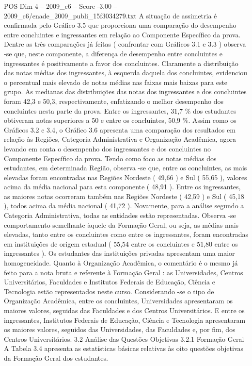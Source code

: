 \begin{textsample}{POS Dim 4 – 2009\_c6 – Score -3.00 – 2009\_c6/enade\_2009\_publi\_15f3034279.txt}
A situação de assimetria é confirmada pelo Gráfico 3.5 que proporciona uma comparação do desempenho entre concluintes e ingressantes em relação ao Componente Específico da prova.
Dentre as três comparações já feitas ( confrontar com Gráficos 3.1 e 3.3 ) observa -se que, neste componente, a diferença de desempenho entre concluintes e ingressantes é positivamente a favor dos concluintes.
Claramente a distribuição das notas médias dos ingressantes, à esquerda daquela dos concluintes, evidenciou o percentual mais elevado de notas médias nas faixas mais baixas para este grupo.
As medianas das distribuições das notas dos ingressantes e dos concluintes foram 42,3 e 50,3, respectivamente, enfatizando o melhor desempenho dos concluintes nesta parte da prova.
Entre os ingressantes, 31,7 \% dos estudantes obtiveram notas superiores a 50 e entre os concluintes, 50,9 \%.
Assim como os Gráficos 3.2 e 3.4, o Gráfico 3.6 apresenta uma comparação dos resultados em relação às Regiões, Categoria Administrativa e Organização Acadêmica, agora levando em conta o desempenho dos ingressantes e dos concluintes no Componente Específico da prova.
Tendo como foco as notas médias dos estudantes, em determinada Região, observa -se que, entre os concluintes, as mais elevadas foram encontradas nas Regiões Nordeste ( 49,66 ) e Sul ( 55,65 ), valores acima da média nacional para esta componente ( 48,91 ).
Entre os ingressantes, as maiores notas ocorreram também nas Regiões Nordeste ( 42,59 ) e Sul ( 45,18 ), todos acima da média nacional ( 41,72 ).
Novamente, para a análise segundo a Categoria Administrativa, todas as entidades estão representadas.
Observa -se comportamento semelhante àquele da Formação Geral, ou seja, as médias mais elevadas, tanto entre os concluintes como entre os ingressantes, foram encontradas em instituições de origem estadual ( 55,54 entre os concluintes e 51,80 entre os ingressantes ).
Os estudantes das instituições privadas apresentam uma maior homogeneidade.
Quanto à Organização Acadêmica, o comentário é o mesmo já feito para a nota bruta e referente à Formação Geral : as Universidades, Centros Universitários, Faculdades e Institutos Federais de Educação, Ciência e Tecnologia estão representados neste curso.
Considerando -se o tipo de Organização Acadêmica, entre os concluintes, Universidades apresentaram os maiores valores, seguidas das Faculdades e dos Centros Universitários.
E entre os ingressantes, Institutos Federais de Educação, Ciência e Tecnologia apresentaram os maiores valores, seguidos das Universidades, das Faculdades e, por fim, dos Centros Universitários. 3.2 Análise das Questões Objetivas 3.2.1 Formação Geral A Tabela 3.4 apresenta as estatísticas básicas relativas às oito questões objetivas da Formação Geral dos estudantes.

\end{textsample}
